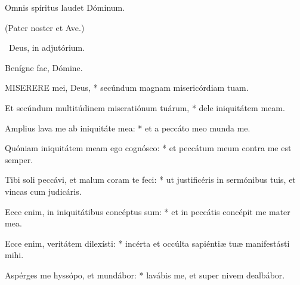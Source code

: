  Omnis spíritus laudet Dóminum.





(Pater noster et Ave.)

\V\ Deus, in adjutórium.

 Benígne fac, Dómine.


\lettrine[lines=2]{M}{ISERERE} mei, Deus, * secúndum magnam misericórdiam tuam.

Et secúndum multitúdinem miseratiónum tuárum, * dele iniquitátem meam.

Amplius lava me ab iniquitáte mea: * et a peccáto meo munda me.

Quóniam iniquitátem meam ego cognósco: * et peccátum meum contra me est semper.

Tibi soli peccávi, et malum coram te feci: * ut justificéris in sermónibus tuis, et vincas cum judicáris.

Ecce enim, in iniquitátibus concéptus sum: * et in peccátis concépit me mater mea.

Ecce enim, veritátem dilexísti: * incérta et occúlta sapiéntiæ tuæ manifestásti mihi.

Aspérges me hyssópo, et mundábor: * lavábis me, et super nivem dealbábor.

